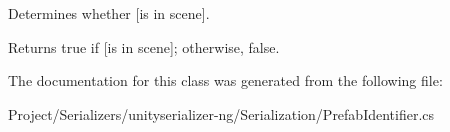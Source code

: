Determines whether \mbox{[}is in scene\mbox{]}. 

\begin{DoxyReturn}{Returns}
{\ttfamily true} if \mbox{[}is in scene\mbox{]}; otherwise, {\ttfamily false}.
\end{DoxyReturn}


The documentation for this class was generated from the following file\+:\begin{DoxyCompactItemize}
\item 
Project/\+Serializers/unityserializer-\/ng/\+Serialization/Prefab\+Identifier.\+cs\end{DoxyCompactItemize}
